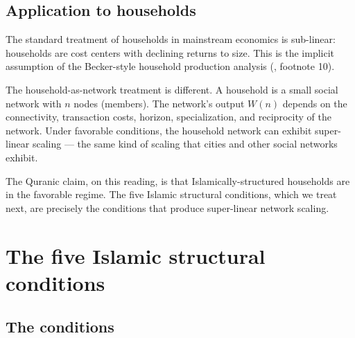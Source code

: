 \subsection{Application to households}

The standard treatment of households in mainstream economics is
sub-linear: households are cost centers with declining returns to
size. This is the implicit assumption of the Becker-style household
production analysis (, footnote 10).

The household-as-network treatment is different. A household is a
small social network with $n$ nodes (members). The network's
output $W(n)$ depends on the connectivity, transaction costs,
horizon, specialization, and reciprocity of the network. Under
favorable conditions, the household network can exhibit
super-linear scaling --- the same kind of scaling that cities and
other social networks exhibit.

The Quranic claim, on this reading, is that Islamically-structured
households are in the favorable regime. The five Islamic
structural conditions, which we treat next, are precisely the
conditions that produce super-linear network scaling.

\section{The five Islamic structural conditions}
\label{sec:network-conditions}

\subsection{The conditions}

